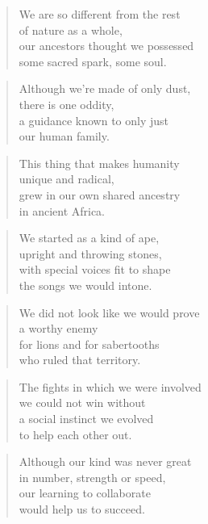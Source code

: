 \documentclass[10pt,a4paper]{article}
\begin{document}
\begin{paracol}{2}
\begin{verse}
We are so different from the rest\\
of nature as a whole,\\
our ancestors thought we possessed\\
some sacred spark, some soul.
\end{verse}

\begin{verse}
Although we’re made of only dust,\\
there is one oddity,\\
a guidance known to only just\\
our human family.
\end{verse}

\begin{verse}
This thing that makes humanity\\
unique and radical,\\
grew in our own shared ancestry\\
in ancient Africa.
\end{verse}

\begin{verse}
We started as a kind of ape,\\
upright and throwing stones,\\
with special voices fit to shape\\
the songs we would intone.
\end{verse}

\begin{verse}
We did not look like we would prove\\
a worthy enemy\\
for lions and for sabertooths\\
who ruled that territory.
\end{verse}

\begin{verse}
The fights in which we were involved\\
we could not win without\\
a social instinct we evolved\\
to help each other out.
\end{verse}

\begin{verse}
Although our kind was never great\\
in number, strength or speed,\\
our learning to collaborate\\
would help us to succeed.
\end{verse}


\end{paracol}
\end{document}
